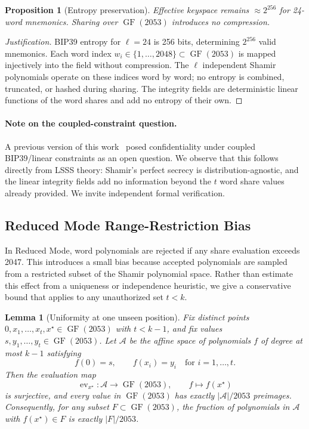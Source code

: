 \documentclass[11pt]{article}
\newcommand{\GF}{\operatorname{GF}}
\newtheorem{lemma}[theorem]{Lemma}
\newtheorem{proposition}[theorem]{Proposition}
\begin{document}
\begin{proposition}[Entropy preservation]
\label{prop:entropy}
Effective keyspace remains $\approx 2^{256}$ for 24-word mnemonics. Sharing over $\GF(2053)$ introduces no compression.
\end{proposition}

\begin{proof}[Justification]
BIP39 entropy for $\ell = 24$ is 256 bits, determining $2^{256}$ valid mnemonics. Each word index $w_i \in \{1, \ldots, 2048\} \subset \GF(2053)$ is mapped injectively into the field without compression. The $\ell$ independent Shamir polynomials operate on these indices word by word; no entropy is combined, truncated, or hashed during sharing. The integrity fields are deterministic linear functions of the word shares and add no entropy of their own.
\end{proof}

\paragraph{Note on the coupled-constraint question.} A previous version of this work~\cite{schiavinato041} posed confidentiality under coupled BIP39/linear constraints as an open question. We observe that this follows directly from LSSS theory: Shamir's perfect secrecy is distribution-agnostic, and the linear integrity fields add no information beyond the $t$ word share values already provided. We invite independent formal verification.

\subsection{Reduced Mode Range-Restriction Bias}
\label{sec:reduced-leak}

In Reduced Mode, word polynomials are rejected if any share evaluation exceeds 2047. This introduces a small bias because accepted polynomials are sampled from a restricted subset of the Shamir polynomial space. Rather than estimate this effect from a uniqueness or independence heuristic, we give a conservative bound that applies to any unauthorized set $t < k$.

\begin{lemma}[Uniformity at one unseen position]
\label{lem:reduced-unseen}
Fix distinct points $0, x_1, \ldots, x_t, x^\star \in \GF(2053)$ with $t < k - 1$, and fix values $s, y_1, \ldots, y_t \in \GF(2053)$. Let $\mathcal{A}$ be the affine space of polynomials $f$ of degree at most $k-1$ satisfying
\[
    f(0) = s,\qquad f(x_i) = y_i \quad \text{for } i = 1, \ldots, t.
\]
Then the evaluation map
\[
    \operatorname{ev}_{x^\star} : \mathcal{A} \to \GF(2053),\qquad f \mapsto f(x^\star)
\]
is surjective, and every value in $\GF(2053)$ has exactly $|\mathcal{A}|/2053$ preimages. Consequently, for any subset $F \subset \GF(2053)$, the fraction of polynomials in $\mathcal{A}$ with $f(x^\star) \in F$ is exactly $|F|/2053$.
\end{lemma}
\end{document}
